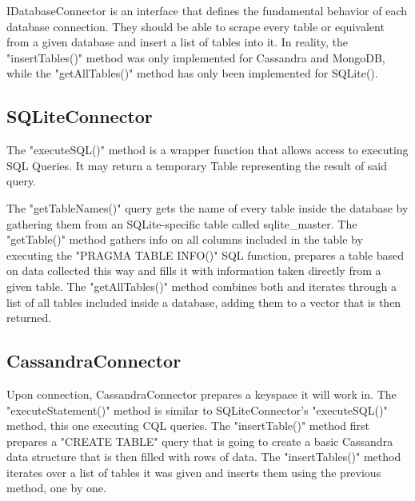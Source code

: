 \par IDatabaseConnector is an interface that defines the fundamental behavior of each database connection. They should be able to scrape every table or equivalent from a given database and insert a list of tables into it. In reality, the "insertTables()" method was only implemented for Cassandra and MongoDB, while the "getAllTables()" method has only been implemented for SQLite().

\subsection{SQLiteConnector}




\par The "executeSQL()" method is a wrapper function that allows access to executing SQL Queries. It may return a temporary Table representing the result of said query.
\par The "getTableNames()" query gets the name of every table inside the database by gathering them from an SQLite-specific table called sqlite\_master. The "getTable()" method gathers info on all columns included in the table by executing the "PRAGMA TABLE INFO()" SQL function, prepares a table based on data collected this way and fills it with information taken directly from a given table. The "getAllTables()" method combines both and iterates through a list of all tables included inside a database, adding them to a vector that is then returned. 

\subsection{CassandraConnector}




\par Upon connection, CassandraConnector prepares a keyspace it will work in. The "executeStatement()" method is similar to SQLiteConnector's "executeSQL()" method, this one executing CQL queries. The "insertTable()" method first prepares a "CREATE TABLE" query that is going to create a basic Cassandra data structure that is then filled with rows of data. The "insertTables()" method iterates over a list of tables it was given and inserts them using the previous method, one by one.

